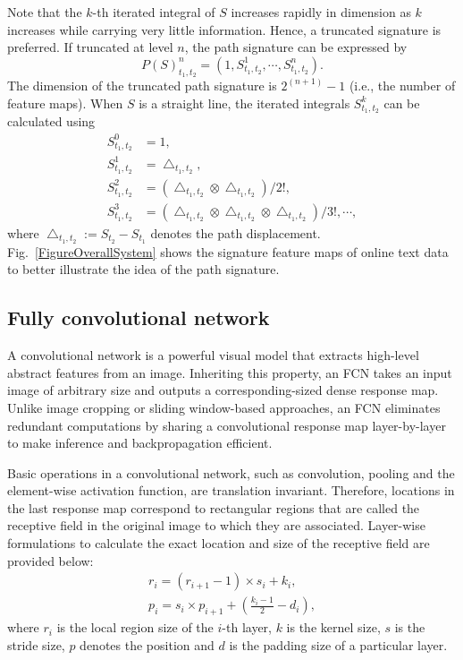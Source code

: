 \documentclass[10pt,conference,a4paper]{IEEEtran}
\begin{document}
Note that the $k$-th iterated integral of $S$ increases rapidly in dimension as $k$ increases while carrying very little information.
Hence, a truncated signature is preferred. If truncated at level $n$, the path signature can be expressed by
\begin{equation}
    P(S)_{t_1,t_2}^n = (1,S_{t_1,t_2}^1,\cdots ,S_{t_1,t_2}^n).
\end{equation}
The dimension of the truncated path signature is $2^{(n+1)}-1$ (i.e., the number of feature maps). When $S$ is a straight line, the iterated integrals $S_{t_1,t_2}^k$ can be calculated using
\begin{equation}
    \begin{split}
        S_{t_1,t_2}^0 &= 1, \\
        S_{t_1,t_2}^1 &=\bigtriangleup_{t_1,t_2}, \\
        S_{t_1,t_2}^2 &=(\bigtriangleup_{t_1,t_2} \otimes \bigtriangleup_{t_1,t_2})/2!,\\
        S_{t_1,t_2}^3 &=(\bigtriangleup_{t_1,t_2} \otimes \bigtriangleup_{t_1,t_2} \otimes \bigtriangleup_{t_1,t_2} )/3!,\cdots,
    \end{split}
\end{equation}
where $\bigtriangleup_{t_1,t_2}:=S_{t_2}-S_{t_1}$ denotes the path displacement.
Fig.~\ref{FigureOverallSystem} shows the signature feature maps of online text data to better illustrate the idea of the path signature.

\subsection{Fully convolutional network}
A convolutional network is a powerful visual model that extracts high-level abstract features from an image.
Inheriting this property, an FCN\cite{long2015fully} takes an input image of arbitrary size and outputs a corresponding-sized dense response map.
Unlike image cropping or sliding window-based approaches, an FCN eliminates redundant computations by sharing a convolutional response map layer-by-layer to make inference and backpropagation efficient.


Basic operations in a convolutional network, such as convolution, pooling and the element-wise activation function, are translation invariant.
Therefore, locations in the last response map correspond to rectangular regions that are called the receptive field in the original image to which they are associated.
Layer-wise formulations to calculate the exact location and size of the receptive field are provided below:
\begin{gather}
    r_i=(r_{i+1}-1)\times s_i+k_i,\\
    p_i=s_i \times p_{i+1}+(\frac{k_i-1}{2}-d_i),
\end{gather}
where $r_i$ is the local region size of the $i$-th layer, $k$ is the kernel size, $s$ is the stride size, $p$ denotes the position and $d$ is the padding size of a particular layer.
\end{document}
